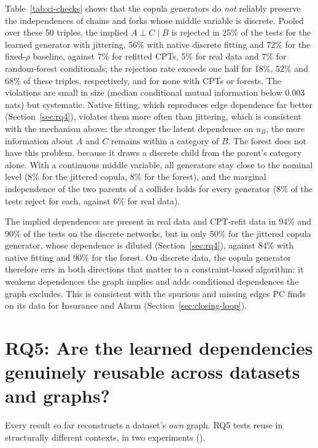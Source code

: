\documentclass[
  english,
  class=report,
  accentcolor=2c,
  marginpar=false,
  parskip=half-,
  fontsize=11pt,
  ruledheaders=false,
  pdfa=false,
  IMRAD=false,
  thesis={type=master}
]{tudapub}
\begin{document}
Table~\ref{tab:ci-checks} shows that the copula generators do \emph{not}
reliably preserve the independences of chains and forks whose middle
variable is discrete. Pooled over these 50 triples, the implied
$A \perp C \mid B$ is rejected in 25\% of the tests for the learned
generator with jittering, 56\% with native discrete fitting and 72\%
for the fixed-$\rho$ baseline, against 7\% for refitted CPTs, 5\%
for real data and 7\% for random-forest conditionals; the rejection
rate exceeds one half for 18\%, 52\% and 68\% of these triples,
respectively, and for none with CPTs or forests. The violations are small
in size (median conditional mutual information below 0.003 nats) but
systematic. Native fitting, which reproduces edge dependence far better
(Section~\ref{sec:rq4}), violates them more often than jittering, which is
consistent with the mechanism above: the stronger the latent dependence on
$u_B$, the more information about $A$ and $C$ remains within a category of
$B$. The forest does not have this problem, because it draws a
discrete child from the parent's category alone. With a continuous middle
variable, all generators stay close to the nominal level (8\% for the
jittered copula, 8\% for the forest), and the marginal independence of
the two parents of a collider holds for every generator (8\% of the tests
reject for each, against 6\% for real data).

The implied dependences are present in real data and CPT-refit data in
94\% and 90\% of the tests on the discrete networks, but in only
50\% for the jittered copula generator, whose dependence is diluted
(Section~\ref{sec:rq4}), against 84\% with native fitting and 90\%
for the forest. On discrete data, the copula generator therefore errs in
both directions that matter to a constraint-based algorithm: it weakens
dependences the graph implies and adds conditional dependences the graph
excludes. This is consistent with the spurious and missing edges PC finds
on its data for Insurance and Alarm (Section~\ref{sec:closing-loop}).

\section{RQ5: Are the learned dependencies genuinely reusable across datasets and graphs?}
\label{sec:composition}
Every result so far reconstructs a dataset's \emph{own} graph. RQ5 tests
reuse in structurally different contexts, in two experiments
().
\end{document}

